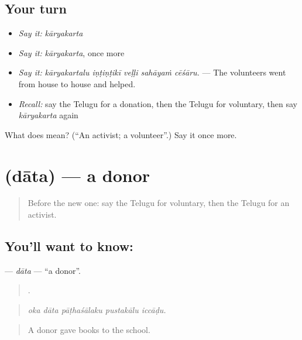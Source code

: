\subsection*{Your turn}
\begin{itemize}
\raggedright
  \item \emph{Say it:} \emph{kāryakarta}
  \item \emph{Say it:} \emph{kāryakarta}, once more
  \item \emph{Say it:} \emph{kāryakartalu iṇṭiṇṭikī veḷḷi sahāyaṁ cēśāru.} — The volunteers went from house to house and helped.
  \item \emph{Recall:} say the Telugu for a donation, then the Telugu for voluntary, then say \emph{kāryakarta} again
\end{itemize}

\begin{tcolorbox}[breakable,colback=teal!4,colframe=teal!35!black,title={Before you move on}]
What does  mean? (\textquotedblleft{}An activist; a volunteer\textquotedblright{}.) Say it once more.
\end{tcolorbox}
\section[\texorpdfstring{\te{దాత} (dāta)}{దాత (dāta)}]{ (dāta) — a donor}

\label{lesson:TE-C410-data}



\begin{quote}
Before the new one: say the Telugu for voluntary, then the Telugu for an activist.
\end{quote}

\subsection*{You'll want to know: }
\textbf{} — \emph{dāta} — \textquotedblleft{}a donor\textquotedblright{}.

\begin{quote}
    .
\end{quote}

\begin{quote}
\emph{oka dāta pāṭhaśālaku pustakālu iccāḍu.}
\end{quote}

\begin{quote}
A donor gave books to the school.
\end{quote}

